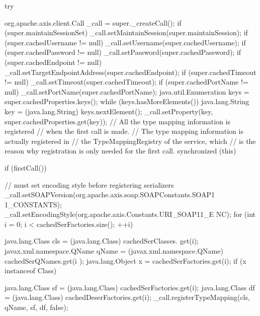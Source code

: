 \begin{DoxyCode}
                                                                                 
            {
        try {
            org.apache.axis.client.Call _call = super._createCall();
            if (super.maintainSessionSet) {
                _call.setMaintainSession(super.maintainSession);
            }
            if (super.cachedUsername != null) {
                _call.setUsername(super.cachedUsername);
            }
            if (super.cachedPassword != null) {
                _call.setPassword(super.cachedPassword);
            }
            if (super.cachedEndpoint != null) {
                _call.setTargetEndpointAddress(super.cachedEndpoint);
            }
            if (super.cachedTimeout != null) {
                _call.setTimeout(super.cachedTimeout);
            }
            if (super.cachedPortName != null) {
                _call.setPortName(super.cachedPortName);
            }
            java.util.Enumeration keys = super.cachedProperties.keys();
            while (keys.hasMoreElements()) {
                java.lang.String key = (java.lang.String) keys.nextElement();
                _call.setProperty(key, super.cachedProperties.get(key));
            }
            // All the type mapping information is registered
            // when the first call is made.
            // The type mapping information is actually registered in
            // the TypeMappingRegistry of the service, which
            // is the reason why registration is only needed for the first call.
            synchronized (this) {
                if (firstCall()) {
                    // must set encoding style before registering serializers
                    _call.setSOAPVersion(org.apache.axis.soap.SOAPConstants.SOAP1
      1_CONSTANTS);
                    _call.setEncodingStyle(org.apache.axis.Constants.URI_SOAP11_E
      NC);
                    for (int i = 0; i < cachedSerFactories.size(); ++i) {
                        java.lang.Class cls = (java.lang.Class) cachedSerClasses.
      get(i);
                        javax.xml.namespace.QName qName =
                                (javax.xml.namespace.QName) cachedSerQNames.get(i
      );
                        java.lang.Object x = cachedSerFactories.get(i);
                        if (x instanceof Class) {
                            java.lang.Class sf = (java.lang.Class)
                                 cachedSerFactories.get(i);
                            java.lang.Class df = (java.lang.Class)
                                 cachedDeserFactories.get(i);
                            _call.registerTypeMapping(cls, qName, sf, df, false);
      
}}}}}}
\end{DoxyCode}
